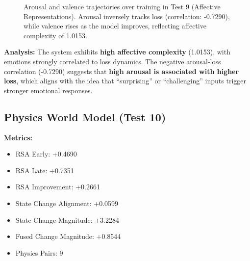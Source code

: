 \documentclass[12pt]{article}
\begin{document}
\begin{figure}[H]
\centering
{}
\caption{Arousal and valence trajectories over training in Test 9
(Affective Representations). Arousal inversely tracks loss
(correlation: -0.7290), while valence rises as the model
improves, reflecting affective complexity of 1.0153.}
\label{fig:affective}
\end{figure}

\textbf{Analysis:}
The system exhibits \textbf{high affective complexity} (1.0153), with
emotions strongly correlated to loss dynamics. The negative
arousal-loss correlation (-0.7290) suggests that \textbf{high arousal
is associated with higher loss}, which aligns with the idea that
``surprising'' or ``challenging'' inputs trigger stronger emotional
responses.

\subsection{Physics World Model (Test 10)}
\label{subsec:test10}

\textbf{Metrics:}
\begin{itemize}
    \item RSA Early: +0.4690
    \item RSA Late: +0.7351
    \item RSA Improvement: +0.2661
    \item State Change Alignment: +0.0599
    \item State Change Magnitude: +3.2284
    \item Fused Change Magnitude: +0.8544
    \item Physics Pairs: 9
\end{itemize}
\end{document}
